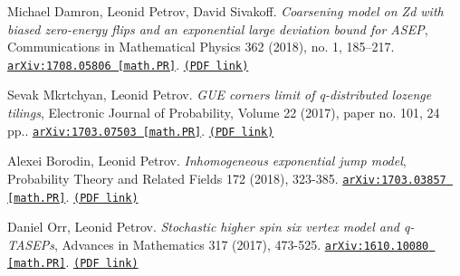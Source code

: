 \begin{etaremune}
\item 
Michael Damron, Leonid Petrov, David Sivakoff.
\emph{Coarsening model on Zd with biased zero-energy flips and an exponential large deviation bound for ASEP}, Communications in Mathematical Physics 362 (2018), no. 1, 185–217. 
\href{https://arxiv.org/abs/1708.05806}{\texttt{arXiv:1708.05806 [math.PR]}}. \href{https://storage.lpetrov.cc/research_files/Petrov-publ/26-publ-petrov-uva.pdf}{\texttt{(PDF link)}}

















\item 
Sevak Mkrtchyan, Leonid Petrov.
\emph{GUE corners limit of q-distributed lozenge tilings}, Electronic Journal of Probability, Volume 22 (2017), paper no. 101, 24 pp.. 
\href{https://arxiv.org/abs/1703.07503}{\texttt{arXiv:1703.07503 [math.PR]}}. \href{https://storage.lpetrov.cc/research_files/Petrov-publ/25-publ-petrov-uva.pdf}{\texttt{(PDF link)}}



\item 
Alexei Borodin, Leonid Petrov.
\emph{Inhomogeneous exponential jump model}, Probability Theory and Related Fields 172 (2018), 323-385. 
\href{https://arxiv.org/abs/1703.03857}{\texttt{arXiv:1703.03857 [math.PR]}}. \href{https://storage.lpetrov.cc/research_files/Petrov-publ/24-publ-petrov-uva-j.pdf}{\texttt{(PDF link)}}

















\item 
Daniel Orr, Leonid Petrov.
\emph{Stochastic higher spin six vertex model and q-TASEPs}, Advances in Mathematics 317 (2017), 473-525. 
\href{https://arxiv.org/abs/1610.10080}{\texttt{arXiv:1610.10080 [math.PR]}}. \href{https://storage.lpetrov.cc/research_files/Petrov-publ/23-publ-petrov-uva.pdf}{\texttt{(PDF link)}}










\end{etaremune}
